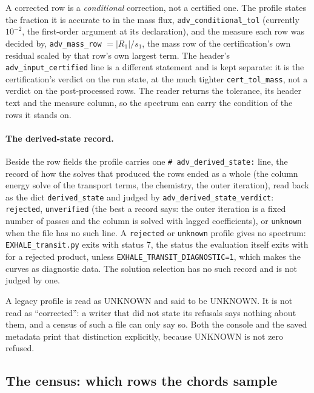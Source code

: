 \documentclass[english,a4paper]{my_memo}
\begin{document}
A corrected row is a \emph{conditional} correction, not a certified one. The
profile states the fraction it is accurate to in the mass flux,
\verb|adv_conditional_tol| (currently $10^{-2}$, the first-order argument at
its declaration), and the measure each row was decided by,
\verb|adv_mass_row| $= |R_1|/s_1$, the mass row of the certification's own
residual scaled by that row's own largest term. The header's
\verb|adv_input_certified| line is a different statement and is kept
separate: it is the certification's verdict on the run state, at the much
tighter \verb|cert_tol_mass|, not a verdict on the post-processed rows. The
reader returns the tolerance, its header text and the measure column, so the
spectrum can carry the condition of the rows it stands on.

\paragraph{The derived-state record.} Beside the row fields the profile
carries one \verb|# adv_derived_state:| line, the record of how the solves
that produced the rows ended as a whole (the column energy solve of the
transport terms, the chemistry, the outer iteration), read back as the dict
\verb|derived_state| and judged by \verb|adv_derived_state_verdict|:
\verb|rejected|, \verb|unverified| (the best a record says: the outer
iteration is a fixed number of passes and the column is solved with lagged
coefficients), or \verb|unknown| when the file has no such line. A
\verb|rejected| or \verb|unknown| profile gives no spectrum:
\verb|EXHALE_transit.py| exits with status 7, the status the evaluation
itself exits with for a rejected product, unless
\verb|EXHALE_TRANSIT_DIAGNOSTIC=1|, which makes the curves as diagnostic
data. The solution selection has no such record and is not judged by one.

A legacy profile is read as UNKNOWN and said to be UNKNOWN. It is not read
as ``corrected'': a writer that did not state its refusals says nothing
about them, and a census of such a file can only say so. Both the console
and the saved metadata print that distinction explicitly, because UNKNOWN is
not zero refused.

\subsection{The census: which rows the chords sample}
\label{sec:census}
\end{document}

